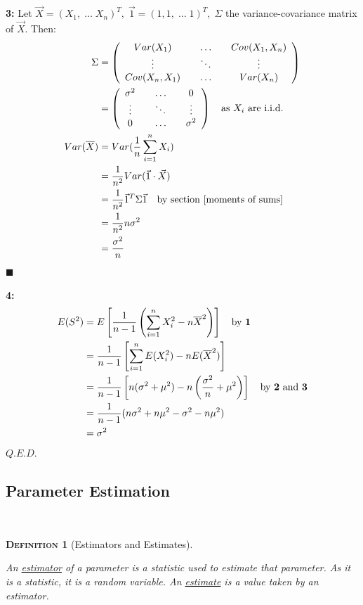 \documentclass[12pt,a4paper]{article}
\newtheorem{definition}{\textsc{Definition}}[section]
\begin{document}
{\bf 3:} Let $\vec{X} = (X_1,\; \hdots\; X_n)^T,\; \vec{1} = (1,1,\; \hdots\; 1)^T,\; \Sigma$ the variance-covariance matrix of $\vec{X}$. Then:
\begin{align*}
\Sigma &= \left(\begin{array}{ccc} Var(X_1)\quad& \hdots\quad& Cov(X_1,X_n)\\ \vdots\quad & \ddots\quad & \vdots\\ Cov(X_n,X_1)\quad& \hdots\quad& Var(X_n)\end{array}\right)\\
&= \left(\begin{array}{ccc} \sigma^2\quad& \hdots\quad& 0\\ \vdots\quad & \ddots\quad & \vdots\\ 0\quad &\hdots\quad &\sigma^2\end{array}\right)\quad\mbox{as $X_i$ are i.i.d.}\\
Var(\overline{X}) &= Var(\frac{1}{n}\sum_{i=1}^n X_i)\\
&= \frac{1}{n^2}Var(\vec{1} \cdot \vec{X})\\
&= \frac{1}{n^2} \vec{1}^T\Sigma\vec{1}\quad\mbox{by section \ref{moments of sums}}\\
&= \frac{1}{n^2}n\sigma^2\\
&= \frac{\sigma^2}{n}
\end{align*}\hfill$\blacksquare$

{\bf 4:}
\begin{align*}
E(S^2) &= E\left[\frac{1}{n-1}\left(\sum_{i=1}^n X_i^2 -n\overline{X}^2\right)\right]\quad\mbox{by {\bf 1}}\\
&= \frac{1}{n-1}\left[\sum_{i=1}^n E(X_i^2) - nE(\overline{X}^2)\right]\\
&= \frac{1}{n-1}\left[n(\sigma^2 + \mu^2) - n\left(\frac{\sigma^2}{n} + \mu^2\right)\right]\quad\mbox{by {\bf 2} and {\bf 3}}\\
&= \frac{1}{n-1}(n\sigma^2 + n\mu^2 - \sigma^2 -n\mu^2)\\
&= \sigma^2
\end{align*}\hfill$Q.E.D.$

\subsection{Parameter Estimation}$\;$

\begin{definition}[Estimators and Estimates]$\;$\par\vspace{1cm}

An \underline{estimator} of a parameter is a statistic used to estimate that parameter. As it is a statistic, it is a random variable. An \underline{estimate} is a value taken by an estimator.

\end{definition}
\end{document}
